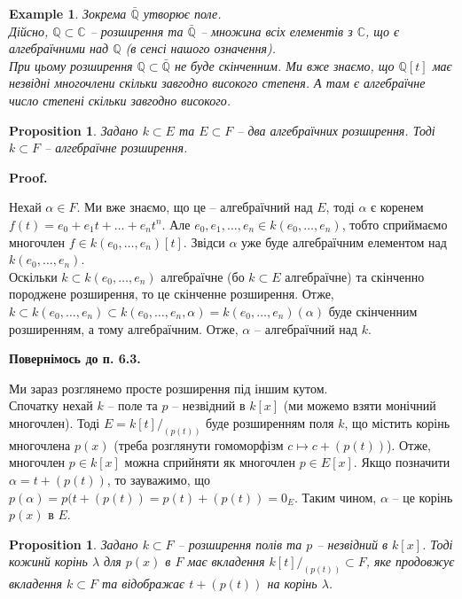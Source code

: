 \documentclass[a4paper, 10pt]{article}
\makeatletter
\theoremstyle{theoremdd}
\theoremstyle{theoremdd}
\theoremstyle{theoremdd}
\theoremstyle{theoremdd}
\theoremstyle{theoremdd}
\newtheorem{example}[theorem]{Example}
\theoremstyle{theoremdd}
\theoremstyle{theoremdd}
\theoremstyle{theoremdd}
\theoremstyle{theoremdd}
\newtheorem{proposition}[theorem]{Proposition}
\theoremstyle{theoremdd}
\theoremstyle{theoremdd}
\theoremstyle{theoremdd}
\theoremstyle{theoremdd}
\theoremstyle{theoremdd}
\theoremstyle{theoremdd}
\renewenvironment{proof}[1][Proof.\\]{\par
\pushQED{\hfill \qed}%
\normalfont \topsep6\p@\@plus6\p@\relax
\trivlist
\item\relax
{\bfseries
#1\@addpunct{.}}\hspace\labelsep\ignorespaces
}{%
\popQED\endtrivlist\@endpefalse
}
\makeatother
\begin{document}
\begin{example}
Зокрема $\bar{\mathbb{Q}}$ утворює поле.\\
Дійсно, $\mathbb{Q} \subset \mathbb{C}$ -- розширення та $\bar{\mathbb{Q}}$ -- множина всіх елементів з $\mathbb{C}$, що є алгебраїчними над $\mathbb{Q}$ (в сенсі нашого означення).\\
При цьому розширення $\mathbb{Q} \subset \bar{\mathbb{Q}}$ не буде скінченним. Ми вже знаємо, що $\mathbb{Q}[t]$ має незвідні многочлени скільки завгодно високого степеня. А там є алгебраїчне число степені скільки завгодно високого.
\end{example}

\begin{proposition}
Задано $k \subset E$ та $E \subset F$ -- два алгебраїчних розширення. Тоді $k \subset F$ -- алгебраїчне розширення.
\end{proposition}

\begin{proof}
Нехай $\alpha \in F$. Ми вже знаємо, що це -- алгебраїчний над $E$, тоді $\alpha$ є коренем $f(t) = e_0 + e_1 t + \dots + e_n t^n$. Але $e_0,e_1,\dots,e_n \in k(e_0,\dots,e_n)$, тобто сприймаємо многочлен $f \in k(e_0,\dots,e_n)[t]$. Звідси $\alpha$ уже буде алгебраїчним елементом над $k(e_0,\dots,e_n)$.\\
Оскільки $k \subset k(e_0,\dots,e_n)$ алгебраїчне (бо $k \subset E$ алгебраїчне) та скінченно породжене розширення, то це скінченне розширення. Отже, $k \subset k(e_0,\dots,e_n) \subset k(e_0,\dots,e_n,\alpha) = k(e_0,\dots,e_n)(\alpha)$ буде скінченним розширенням, а тому алгебраїчним. Отже, $\alpha$ -- алгебраїчний над $k$.
\end{proof}

\begin{center}
\textbf{Повернімось до п. 6.3.}
\end{center}

Ми зараз розглянемо просте розширення під іншим кутом.\\
Спочатку нехай $k$ -- поле та $p$ -- незвідний в $k[x]$ (ми можемо взяти монічний многочлен). Тоді $E = k[t]/_{(p(t))}$ буде розширенням поля $k$, що містить корінь многочлена $p(x)$ (треба розглянути гомоморфізм $c \mapsto c + (p(t))$). Отже, многочлен $p \in k[x]$ можна сприйняти як многочлен $p \in E[x]$. Якщо позначити $\alpha = t + (p(t))$, то зауважимо, що $p(\alpha) = p(t + (p(t)) = p(t) + (p(t)) = 0_E$. Таким чином, $\alpha$ -- це корінь $p(x)$ в $E$.

\begin{proposition}
\label{map_from_roots_to_some_embedding}
Задано $k \subset F$ -- розширення полів та $p$ -- незвідний в $k[x]$. Тоді кожинй корінь $\lambda$ для $p(x)$ в $F$ має вкладення $k[t]/_{(p(t))} \subset F$, яке продовжує вкладення $k \subset F$ та відображає $t + (p(t))$ на корінь $\lambda$.
\end{proposition}
\end{document}
